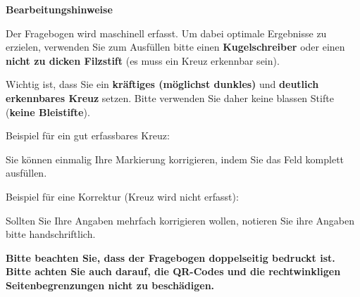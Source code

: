 \vspace{.75cm}

\begin{info}
\vspace{.5em}

\textbf{\Large Bearbeitungshinweise}

Der Fragebogen wird maschinell erfasst. Um dabei optimale Ergebnisse zu erzielen, verwenden Sie zum Ausfüllen bitte einen \textbf{Kugelschreiber} oder einen \textbf{nicht zu dicken Filzstift} (es muss ein Kreuz erkennbar sein).

\vspace{.5em}

Wichtig ist, dass Sie ein \textbf{kräftiges (möglichst dunkles)} und \textbf{deutlich erkennbares Kreuz} setzen. Bitte verwenden Sie daher keine blassen Stifte (\textbf{keine Bleistifte}).

\vspace{.5em}

Beispiel für ein gut erfassbares Kreuz: {\LARGE \checkedbox{}}

\vspace{.5em}

Sie können einmalig Ihre Markierung korrigieren, indem Sie das Feld komplett ausfüllen.

\vspace{.5em}

Beispiel für eine Korrektur (Kreuz wird nicht erfasst): {\LARGE \correctedbox{}}

\vspace{.5em}

Sollten Sie Ihre Angaben mehrfach korrigieren wollen, notieren Sie ihre Angaben bitte handschriftlich.

\vspace{.5em}

\textbf{Bitte beachten Sie, dass der Fragebogen doppelseitig bedruckt ist. Bitte achten Sie auch darauf, die QR-Codes und die rechtwinkligen Seitenbegrenzungen nicht zu beschädigen.}

\end{info}
